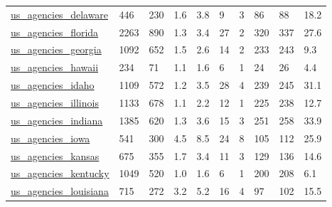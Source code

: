\begin{longtable}{llllllllll}
 \href{http://govmaps.cid.hks.harvard.edu}{us\_agencies\_delaware}                                                            & 446        & 230   & 1.6    & 3.8    & 9     & 3      & 86     & 88     & 18.2    \\
 \href{http://govmaps.cid.hks.harvard.edu}{us\_agencies\_florida}                                                             & 2263       & 890   & 1.3    & 3.4    & 27    & 2      & 320    & 337    & 27.6    \\
 \href{http://govmaps.cid.hks.harvard.edu}{us\_agencies\_georgia}                                                             & 1092       & 652   & 1.5    & 2.6    & 14    & 2      & 233    & 243    & 9.3     \\
 \href{http://govmaps.cid.hks.harvard.edu}{us\_agencies\_hawaii}                                                              & 234        & 71    & 1.1    & 1.6    & 6     & 1      & 24     & 26     & 4.4     \\
 \href{http://govmaps.cid.hks.harvard.edu}{us\_agencies\_idaho}                                                               & 1109       & 572   & 1.2    & 3.5    & 28    & 4      & 239    & 245    & 31.1    \\
 \href{http://govmaps.cid.hks.harvard.edu}{us\_agencies\_illinois}                                                            & 1133       & 678   & 1.1    & 2.2    & 12    & 1      & 225    & 238    & 12.7    \\
 \href{http://govmaps.cid.hks.harvard.edu}{us\_agencies\_indiana}                                                             & 1385       & 620   & 1.3    & 3.6    & 15    & 3      & 251    & 258    & 33.9    \\
 \href{http://govmaps.cid.hks.harvard.edu}{us\_agencies\_iowa}                                                                & 541        & 300   & 4.5    & 8.5    & 24    & 8      & 105    & 112    & 25.9    \\
 \href{http://govmaps.cid.hks.harvard.edu}{us\_agencies\_kansas}                                                              & 675        & 355   & 1.7    & 3.4    & 11    & 3      & 129    & 136    & 14.6    \\
 \href{http://govmaps.cid.hks.harvard.edu}{us\_agencies\_kentucky}                                                            & 1049       & 520   & 1.0    & 1.6    & 6     & 1      & 200    & 208    & 6.1     \\
 \href{http://govmaps.cid.hks.harvard.edu}{us\_agencies\_louisiana}                                                           & 715        & 272   & 3.2    & 5.2    & 16    & 4      & 97     & 102    & 15.5    \\

\end{longtable}
